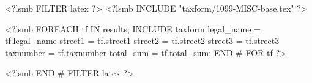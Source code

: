 <?lsmb FILTER latex ?>
<?lsmb INCLUDE "taxform/1099-MISC-base.tex" ?>

<?lsmb FOREACH tf IN results;
INCLUDE taxform 
legal_name = tf.legal_name
street1 = tf.street1
street2 = tf.street2
street3 = tf.street3
taxnumber = tf.taxnumber
total_sum = tf.total_sum;
END # FOR tf  ?>

<?lsmb END # FILTER latex ?>
